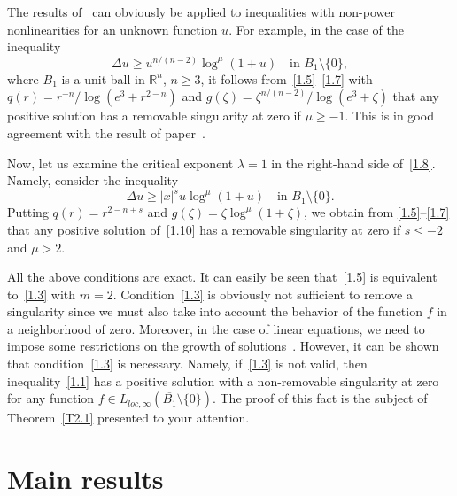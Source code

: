 \documentclass[11pt]{amsart}
\theoremstyle{definition}
\numberwithin{equation}{section}
\begin{document}
The results of~\cite{meCMFI} can obviously be applied to inequalities with non-power nonlinearities for an unknown function $u$. 
For example, in the case of the inequality
$$
	\Delta u \ge u^{n / (n - 2)} \log^\mu (1 + u)
	\quad
	\mbox{in } B_1 \setminus \{ 0 \},
$$
where $B_1$ is a unit ball in $\mathbb R^n$, $n \ge 3$,
it follows from~\eqref{1.5}--\eqref{1.7} with $q (r) = r^{- n} / \log (e^3 + r^{2 - n})$ and $g (\zeta) = \zeta^{n / (n - 2)} / \log (e^3 + \zeta)$ that any positive solution 
has a removable singularity at zero if $\mu \ge -1$. This is in good agreement with the result of paper~\cite{VV}.

Now, let us examine the critical exponent $\lambda = 1$ in the right-hand side of~\eqref{1.8}. Namely, consider the inequality
\begin{equation}
	\Delta u \ge |x|^s u \log^\mu (1 + u)
	\quad
	\mbox{in } B_1 \setminus \{ 0 \}.
	\label{1.10}
\end{equation}
Putting $q (r) = r^{2 - n + s}$ and $g (\zeta) = \zeta \log^\mu (1 + \zeta)$, 
we obtain from \eqref{1.5}--\eqref{1.7} that any positive solution of~\eqref{1.10} has a removable singularity at zero if $s \le - 2$ and $\mu > 2$.

All the above conditions are exact.
It can easily be seen that~\eqref{1.5} is equivalent to~\eqref{1.3} with $m = 2$.
Condition~\eqref{1.3} is obviously not sufficient to remove a singularity since 
we must also take into account the behavior of the function $f$ in a neighborhood of zero.
Moreover, in the case of linear equations, we need to impose some restrictions on the growth of solutions~\cite{Marcus}.
However, it can be shown that condition~\eqref{1.3} is necessary. 
Namely, if~\eqref{1.3} is not valid, then inequality~\eqref{1.1} has a positive solution with a non-removable singularity at zero for any function $f \in L_{loc, \infty} (\overline{B_1} \setminus \{ 0 \})$.
The proof of this fact is the subject of Theorem~\ref{T2.1} presented to your attention.
 
\section{Main results}
\end{document}
